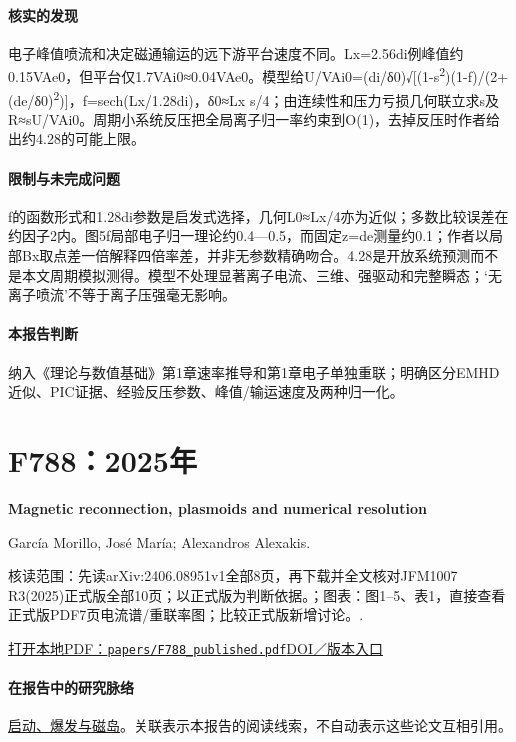 \documentclass[UTF8,a4paper,11pt,openany,fontset=fandol]{ctexbook}
\begin{document}
\paragraph{核实的发现}电子峰值喷流和决定磁通输运的远下游平台速度不同。Lx=2.56di例峰值约0.15VAe0，但平台仅1.7VAi0≈0.04VAe0。模型给U/VAi0=(di/δ0)√[(1-s\textsuperscript{2})(1-f)/(2+(de/δ0)\textsuperscript{2})]，f=sech(Lx/1.28di)，δ0≈Lx s/4；由连续性和压力亏损几何联立求s及R≈sU/VAi0。周期小系统反压把全局离子归一率约束到O(1)，去掉反压时作者给出约4.28的可能上限。

\paragraph{限制与未完成问题}f的函数形式和1.28di参数是启发式选择，几何L0≈Lx/4亦为近似；多数比较误差在约因子2内。图5f局部电子归一理论约0.4—0.5，而固定z=de测量约0.1；作者以局部Bx取点差一倍解释四倍率差，并非无参数精确吻合。4.28是开放系统预测而不是本文周期模拟测得。模型不处理显著离子电流、三维、强驱动和完整瞬态；‘无离子喷流’不等于离子压强毫无影响。

\paragraph{本报告判断}纳入《理论与数值基础》第1章速率推导和第1章电子单独重联；明确区分EMHD近似、PIC证据、经验反压参数、峰值/输运速度及两种归一化。

\section{F788：2025年}\label{paper:F788}

\textbf{Magnetic reconnection,  plasmoids and numerical resolution}\citep{F788}\

García Morillo,  José María;  Alexandros Alexakis.

\textsf{核读范围：}先读arXiv:2406.08951v1全部8页，再下载并全文核对JFM1007 R3(2025)正式版全部10页；以正式版为判断依据。；\textsf{图表：}图1–5、表1，直接查看正式版PDF7页电流谱/重联率图；比较正式版新增讨论。.

\href{run:../papers/F788_published.pdf}{打开本地PDF：\texttt{papers/F788\_published.pdf}}\quad\href{https://doi.org/10.1017/jfm.2025.109}{DOI／版本入口}

\paragraph{在报告中的研究脉络}\hyperref[story:onset]{启动、爆发与磁岛}。关联表示本报告的阅读线索，不自动表示这些论文互相引用。
\end{document}

